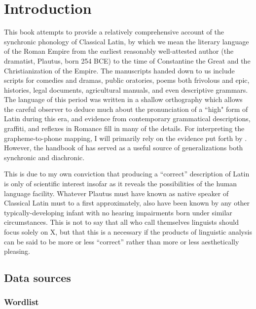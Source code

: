 \chapter{Introduction}

This book attempts to provide a relatively comprehensive account of the synchronic phonology of Classical Latin, by which we mean the literary language of the Roman Empire from the earliest reasonably well-attested author (the dramatist, Plautus, born 254 BCE) to the time of Constantine the Great and the Christianization of the Empire.
The manuscripts handed down to us include scripts for comedies and dramas, public oratories, poems both frivolous and epic, histories, legal documents, agricultural manuals, and even descriptive grammars.
The language of this period was written in a shallow orthography which allows the careful observer to deduce much about the pronunciation of a ``high" form of Latin during this era, and evidence from contemporary grammatical descriptions, graffiti, and reflexes in Romance fill in many of the details. 
For interpreting the grapheme-to-phone mapping, I will primarily rely on the evidence put forth by \citet{Allen1976}.
However, the handbook of \citet{Sommer1902} has served as a useful source of generalizations both synchronic and diachronic.

This is due to my own conviction that producing a ``correct'' description of Latin is only of scientific interest insofar as it reveals the possibilities of the human language facility. 
Whatever Plautus must have known as native speaker of Classical Latin must to a first approximately, also have been known by any other typically-developing infant with no hearing impairments born under similar circumstances.
This is not to say that all who call themselves linguists should focus solely on X, but that this is a necessary if the products of linguistic analysis can be said to be more or less ``correct'' rather than more or less aesthetically pleasing.


\section{Data sources}


\subsection{Wordlist}



